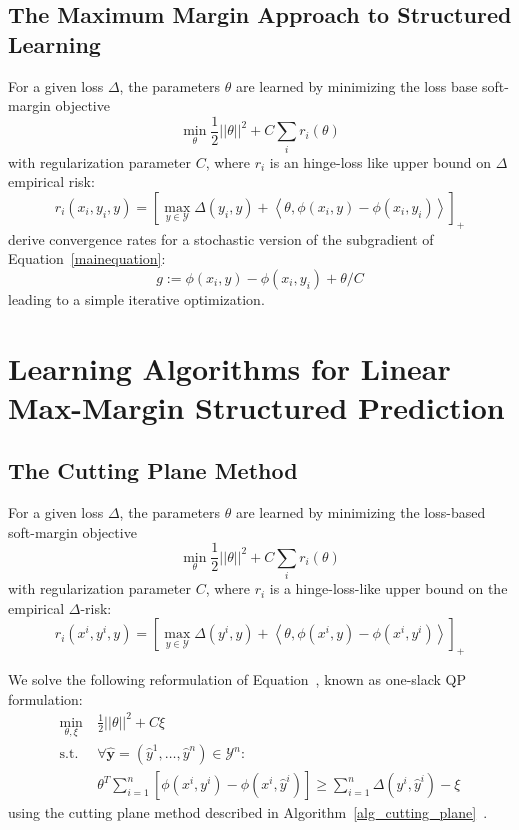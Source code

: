 
\subsection{The Maximum Margin Approach to Structured Learning}
For a given loss $\Delta$, the parameters $\theta$ are learned by minimizing
the loss base soft-margin objective
\begin{equation}\label{mainequation}
    \min_\theta \frac{1}{2} ||\theta||^2 + C \sum_i  r_i(\theta)
\end{equation}
with regularization parameter $C$, where $r_i$ is an hinge-loss like upper
bound on $\Delta$ empirical risk:
\[r_i(x_i, y_i, y) = [\max_{y \in \mathcal{Y}} \Delta(y_i, y) + \left<\theta, \phi(x_i, y) - \phi(x_i, y_i) \right >]_+ \]
\citep{ratliff2007online} derive convergence rates for a stochastic version of the subgradient of  Equation~\ref{mainequation}:
\begin{equation}\label{subgradient}
    g := \phi(x_i, y) - \phi(x_i, y_i) + \theta / C
\end{equation}
leading to a simple iterative optimization.

\section{Learning Algorithms for Linear Max-Margin Structured Prediction}
\subsection{The Cutting Plane Method}\label{cutting_plane}

For a given loss $\Delta$, the parameters $\theta$ are learned by minimizing
the loss-based soft-margin objective
\begin{equation}\label{eq:mainequation}
\min_\theta \frac{1}{2} ||\theta||^2 + C \sum_i  r_i(\theta)
\end{equation}
with regularization parameter $C$, where $r_i$ is a hinge-loss-like upper
bound on the empirical $\Delta$-risk:
\[r_i(x^i, y^i, y) = \left [\max_{y \in \mathcal{Y}} \Delta(y^i, y) + \left<\theta, \phi(x^i, y) - \phi(x^i, y^i) \right > \right]_+ \]

We solve the following reformulation of Equation~, known as one-slack QP formulation:
\begin{align}\label{eq:oneslack}
    \min_{\theta, \xi}\ &\frac{1}{2} ||\theta||^2 + C \xi\\
    \text{s.t. }&\forall \hat{\mathbf{y}}=(\hat{y}^1, \dots, \hat{y}^n) \in \mathcal{Y}^n:\\
        &\theta^T \sum_{i=1}^n [\phi(x^i, y^i) - \phi(x^i,
            \hat{y}^i)] \geq \sum_{i=1}^n \Delta(y^i, \hat{y}^i)
            - \xi
\end{align}
using the cutting plane method described in
Algorithm~\ref{alg_cutting_plane}~\citep{joachims2009cutting}.

